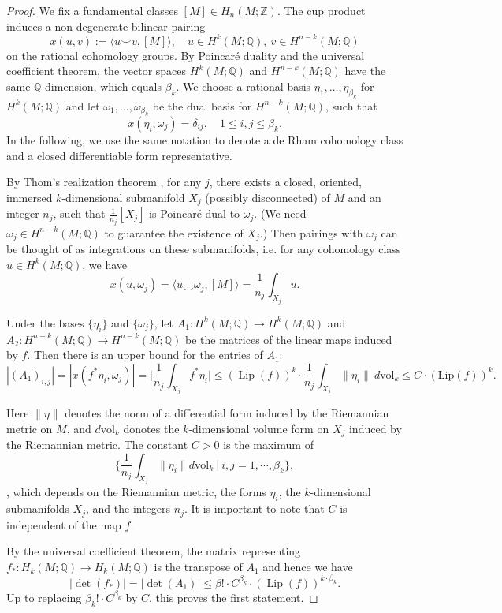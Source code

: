 \documentclass{amsart}
\newcommand{\Q}{\mathbb{Q}}
\newcommand{\Z}{\mathbb{Z}}
\newcommand{\ra}{\rightarrow}
\newcommand{\lip}{\operatorname{Lip}}
\begin{document}
\begin{proof}
    We fix a fundamental classes $[M]\in H_n(M;\Z)$. The cup product induces a non-degenerate bilinear pairing 
    \[
        x(u,v):=\langle u\smile v,[M]\rangle,\quad u\in H^k(M;\Q),\ v\in H^{n-k}(M;\Q)
    \]
    on the rational cohomology groups. By Poincar\'e duality and the universal coefficient theorem,  the vector spaces $H^{k}(M;\Q)$ and $H^{n-k}(M;\Q)$ have the same $\Q$-dimension, which equals $\beta_k$. We choose a rational basis $\eta_1,\ldots,\eta_{\beta_k}$ for $H^{k}(M;\Q)$ and let $\omega_1,\ldots,\omega_{\beta_k}$ be the dual basis for $H^{n-k}(M;\Q)$, such that
    \[
        x(\eta_i,\omega_j)=\delta_{ij},\quad 1\leqslant i,j\leqslant \beta_k.
    \]
In the following, we use the same notation to denote a de Rham cohomology class and a closed differentiable form representative.
    
By Thom's realization theorem \cite{Thom}, for any $j$, there exists a closed, oriented, immersed $k$-dimensional submanifold $X_j$ (possibly disconnected) of $M$ and an integer $n_j$, such that $\frac 1{n_j}[X_j]$ is Poincar\'e dual to $\omega_j$. (We need $\omega_j\in H^{n-k}(M;\mathbb{Q})$ to guarantee the existence of $X_j$.) Then pairings with $\omega_j$ can be thought of as integrations on these submanifolds, i.e. for any cohomology class $u\in H^{k}(M;\Q)$, we have
\[
    x(u,\omega_j)=\langle u\smile \omega_j,[M]\rangle=\frac{1}{n_j}\int_{X_j}u.
\]


    Under the bases $\{\eta_i\}$ and $\{\omega_j\}$, 
    let $A_1:H^k(M;\Q)\ra H^k(M;\Q)$ and $A_2:H^{n-k}(M;\Q)\ra H^{n-k}(M;\Q)$ be the matrices of the linear maps induced by $f$. Then there is an upper bound for the entries of $A_1$: 
    \[
     |(A_1)_{i,j}|=|x(f^*\eta_i,\omega_j)|=\Big|\frac{1}{n_j}\int_{X_j}f^*\eta_i\Big| \leqslant (\lip (f))^k\cdot\frac{1}{n_j}\int_{X_j}\|\eta_i\|\ d\text{vol}_k\leq C\cdot (\text{Lip}(f))^k.
    \]
    
    Here $\|\eta\|$ denotes the norm of a differential form induced by the Riemannian metric on $M$, and $d\text{vol}_k$ donotes the $k$-dimensional volume form on $X_j$ induced by the Riemannian metric. The constant $C>0$ is the maximum of 
    $$\{\frac{1}{n_j}\int_{X_j}\|\eta_i\|d\text{vol}_k\ |\ i,j=1,\cdots,\beta_k\},$$, which depends on the Riemannian metric, the forms $\eta_i$, the $k$-dimensional submanifolds $X_j$, and the integers $n_j$. It is important to note that $C$ is independent of the map $f$.
   
    By the universal coefficient theorem, the matrix representing $f_*:H_k(M;\mathbb{Q})\to H_k(M;\mathbb{Q})$ is the transpose of $A_1$ and hence we have
    \[
        |\det(f_*)|=|\det (A_1)|\leqslant \beta!\cdot C^{\beta_k}\cdot (\lip (f))^{k\cdot \beta_k}.
    \]
    Up to replacing $\beta_k!\cdot C^{\beta_k}$ by $C$, this proves the first statement.
    

\end{proof}
\end{document}
